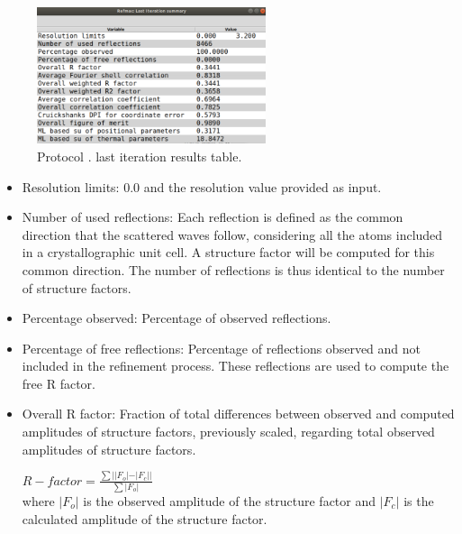 \begin{itemize}
\begin{itemize}
\begin{figure}[H]
         \centering 
         \captionsetup{width=.7\linewidth} 
         \includegraphics[width=0.60\textwidth]{Images_appendix/Fig132.pdf}
         \caption{Protocol .  last iteration results table.}
         \label{fig:app_protocol_refmac_7}
        \end{figure}
     
     \begin{itemize}
     \item Resolution limits: 0.0 and the resolution value provided as input.
     
     \item Number of used reflections: Each reflection is defined as the common direction that the scattered waves follow, considering all the atoms included in a crystallographic unit cell. A structure factor will be computed for this common direction. The number of reflections is thus identical to the number of structure factors.
     
     \item Percentage observed: Percentage of observed reflections.
     
     \item Percentage of free reflections: Percentage of reflections observed and not included in the refinement process. These reflections are used to compute the free R factor.
     
     \item Overall R factor: Fraction of total differences between observed and computed amplitudes of structure factors, previously scaled, regarding total observed amplitudes of structure factors.
     
     \begin{math}
     R-factor = \frac{\sum||F_o|-|F_c||}{\sum|F_o|} 
     \end{math}\\
     
     where $|F_o|$ is the observed amplitude of the structure factor and $|F_c|$ is the calculated amplitude of the structure factor.
     

\end{itemize}
\end{itemize}
\end{itemize}
